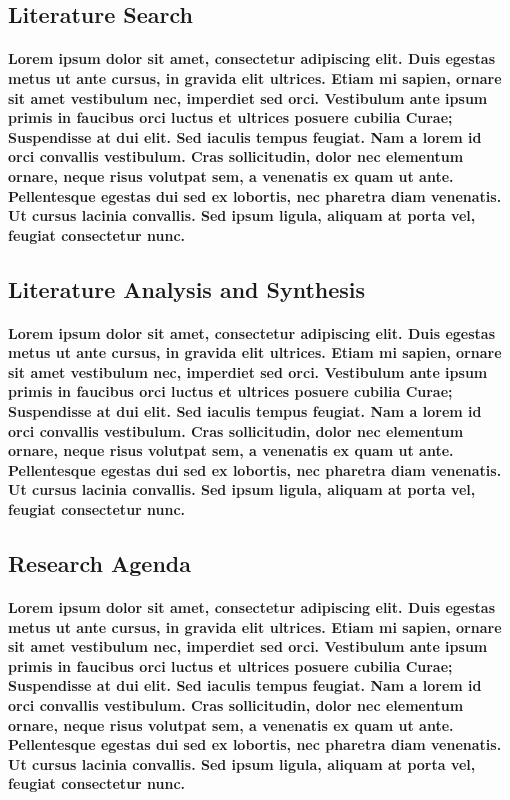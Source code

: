 \documentclass[11pt, twocolumn]{article}
\begin{document}
\subsection{Literature Search}
\paragraph{Lorem ipsum dolor sit amet, consectetur adipiscing elit. Duis egestas metus ut ante cursus, in gravida elit ultrices. Etiam mi sapien, ornare sit amet vestibulum nec, imperdiet sed orci. Vestibulum ante ipsum primis in faucibus orci luctus et ultrices posuere cubilia Curae; Suspendisse at dui elit. Sed iaculis tempus feugiat. Nam a lorem id orci convallis vestibulum. Cras sollicitudin, dolor nec elementum ornare, neque risus volutpat sem, a venenatis ex quam ut ante. Pellentesque egestas dui sed ex lobortis, nec pharetra diam venenatis. Ut cursus lacinia convallis. Sed ipsum ligula, aliquam at porta vel, feugiat consectetur nunc.}

\subsection{Literature Analysis and Synthesis}
\paragraph{Lorem ipsum dolor sit amet, consectetur adipiscing elit. Duis egestas metus ut ante cursus, in gravida elit ultrices. Etiam mi sapien, ornare sit amet vestibulum nec, imperdiet sed orci. Vestibulum ante ipsum primis in faucibus orci luctus et ultrices posuere cubilia Curae; Suspendisse at dui elit. Sed iaculis tempus feugiat. Nam a lorem id orci convallis vestibulum. Cras sollicitudin, dolor nec elementum ornare, neque risus volutpat sem, a venenatis ex quam ut ante. Pellentesque egestas dui sed ex lobortis, nec pharetra diam venenatis. Ut cursus lacinia convallis. Sed ipsum ligula, aliquam at porta vel, feugiat consectetur nunc.}

\subsection{Research Agenda}
\paragraph{Lorem ipsum dolor sit amet, consectetur adipiscing elit. Duis egestas metus ut ante cursus, in gravida elit ultrices. Etiam mi sapien, ornare sit amet vestibulum nec, imperdiet sed orci. Vestibulum ante ipsum primis in faucibus orci luctus et ultrices posuere cubilia Curae; Suspendisse at dui elit. Sed iaculis tempus feugiat. Nam a lorem id orci convallis vestibulum. Cras sollicitudin, dolor nec elementum ornare, neque risus volutpat sem, a venenatis ex quam ut ante. Pellentesque egestas dui sed ex lobortis, nec pharetra diam venenatis. Ut cursus lacinia convallis. Sed ipsum ligula, aliquam at porta vel, feugiat consectetur nunc.}
\end{document}
